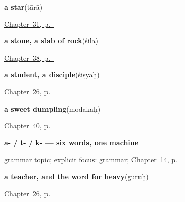 \noindent\begin{minipage}[t]{\linewidth}
\raggedright
\textbf{a star}\enspace\emph{}\enspace(tārā)\par
\footnotesize \hyperref[ch:sa-sky]{Chapter~31, p.~\pageref*{ch:sa-sky}}
\end{minipage}\par\smallskip

\noindent\begin{minipage}[t]{\linewidth}
\raggedright
\textbf{a stone, a slab of rock}\enspace\emph{}\enspace(śilā)\par
\footnotesize \hyperref[ch:sa-fire-and-stone]{Chapter~38, p.~\pageref*{ch:sa-fire-and-stone}}
\end{minipage}\par\smallskip

\noindent\begin{minipage}[t]{\linewidth}
\raggedright
\textbf{a student, a disciple}\enspace\emph{}\enspace(śiṣyaḥ)\par
\footnotesize \hyperref[ch:sa-roles]{Chapter~26, p.~\pageref*{ch:sa-roles}}
\end{minipage}\par\smallskip

\noindent\begin{minipage}[t]{\linewidth}
\raggedright
\textbf{a sweet dumpling}\enspace\emph{}\enspace(modakaḥ)\par
\footnotesize \hyperref[ch:sa-in-the-kitchen]{Chapter~40, p.~\pageref*{ch:sa-in-the-kitchen}}
\end{minipage}\par\smallskip

\noindent\begin{minipage}[t]{\linewidth}
\raggedright
\textbf{a- / t- / k- — six words, one machine}\par
\footnotesize grammar topic; explicit focus: grammar; \hyperref[ch:sa-pointing-and-asking]{Chapter~14, p.~\pageref*{ch:sa-pointing-and-asking}}
\end{minipage}\par\smallskip

\noindent\begin{minipage}[t]{\linewidth}
\raggedright
\textbf{a teacher, and the word for heavy}\enspace\emph{}\enspace(guruḥ)\par
\footnotesize \hyperref[ch:sa-roles]{Chapter~26, p.~\pageref*{ch:sa-roles}}
\end{minipage}\par\smallskip

